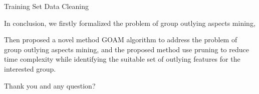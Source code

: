 \documentclass[
 size=14pt,
 paper=smartboard,  %
 mode=present, 		%
 display=slides, 	%
 style=tuliplab,  	%
 pauseslide,
 fleqn,leqno]{powerdot}
\begin{document}
\begin{slide}[toc=,bm=]{Training Set Data Cleaning}
\begin{note}
In conclusion,
we firstly formalized the problem of
group outlying aspects mining,

Then proposed a novel method GOAM algorithm to address the problem of
group outlying aspects mining,
and the proposed method use pruning to reduce time complexity
while identifying the suitable set of outlying features for the interested group.

Thank you and any question?
\end{note}

\end{slide}









\end{document}
